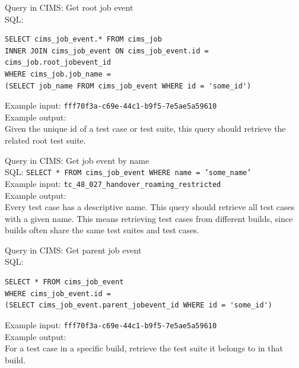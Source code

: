 \label{q:getrootts}
Query in CIMS: Get root job event \\
SQL:
\begin{verbatim}
SELECT cims_job_event.* FROM cims_job
INNER JOIN cims_job_event ON cims_job_event.id = cims_job.root_jobevent_id
WHERE cims_job.job_name =
(SELECT job_name FROM cims_job_event WHERE id = 'some_id')

\end{verbatim}
Example input: {\tt fff70f3a-c69e-44c1-b9f5-7e5ae5a59610 } \\
Example output: \\
Given the unique id of a test case or test suite, this query should retrieve the related root test suite.

\label{q:gettcbyname}
Query in CIMS: Get job event by name \\
SQL: {\tt SELECT * FROM cims\_job\_event WHERE name = 'some\_name' } \\
Example input: {\tt tc\_48\_027\_handover\_roaming\_restricted } \\
Example output: \\
Every test case has a descriptive name. This query should retrieve all test cases with a given name. This means retrieving test cases from different builds, since builds often share the same test suites and test cases.

\label{q:gettsfortc}
Query in CIMS: Get parent job event \\
SQL:
\begin{verbatim}
SELECT * FROM cims_job_event
WHERE cims_job_event.id =
(SELECT cims_job_event.parent_jobevent_id WHERE id = 'some_id')
\end{verbatim}
Example input: {\tt fff70f3a-c69e-44c1-b9f5-7e5ae5a59610 } \\
Example output: \\
For a test case in a specific build, retrieve the test suite it belongs to in that build.

